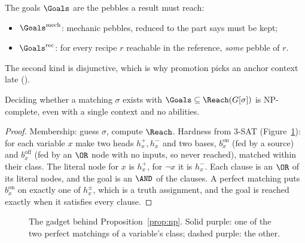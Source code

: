 The goals $\Goals$ are the pebbles a result must reach:
\begin{itemize}[nosep]
\item $\Goals^{\mathrm{mech}}$: mechanic pebbles, reduced to the part  says must be kept;
\item $\Goals^{\mathrm{rec}}$: for every recipe $r$ reachable in the reference, \emph{some} pebble of $r$.
\end{itemize}
The second kind is disjunctive, which is why promotion picks an anchor context late ().

\begin{proposition}\label{prop:np}
Deciding whether a matching $\sigma$ exists with $\Goals\subseteq\Reach(G[\sigma])$ is NP-complete, even with a single context and no abilities.
\end{proposition}
\begin{proof}
Membership: guess $\sigma$, compute $\Reach$. Hardness from 3-SAT (Figure~\ref{fig:np}): for each variable $x$ make two heads $h_x^{+},h_x^{-}$ and two bases, $b_x^{\mathrm{on}}$ (fed by a source) and $b_x^{\mathrm{off}}$ (fed by an $\OR$ node with no inputs, so never reached), matched within their class. The literal node for $x$ is $h_x^{+}$, for $\neg x$ it is $h_x^{-}$. Each clause is an $\OR$ of its literal nodes, and the goal is an $\AND$ of the clauses. A perfect matching puts $b^{\mathrm{on}}_x$ on exactly one of $h^{\pm}_x$, which is a truth assignment, and the goal is reached exactly when it satisfies every clause.
\end{proof}

\begin{figure}[t]
\centering
{}
\caption{The gadget behind Proposition~\ref{prop:np}. Solid purple: one of the two perfect matchings of a variable's class; dashed purple: the other.}
\label{fig:np}
\end{figure}

